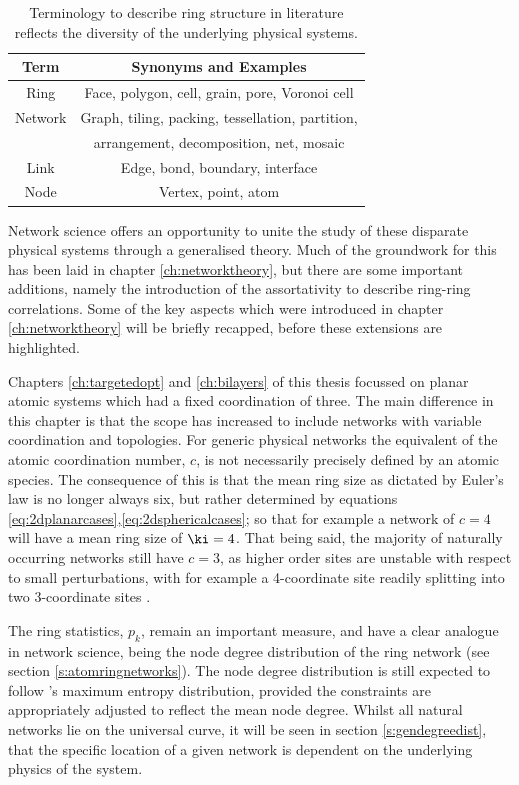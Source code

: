 \begin{table}[bt]
	\centering
     \caption{Terminology to describe ring structure in literature reflects the diversity of the underlying physical systems.}
     \label{tab:genterms}
     \begin{tabular}{cc}
     \toprule
     Term & Synonyms and Examples \\
     \midrule
     Ring & Face, polygon, cell, grain, pore, Voronoi cell\\
     Network & Graph, tiling, packing, tessellation, partition, \\
     & arrangement, decomposition, net, mosaic\\
     Link & Edge, bond, boundary, interface \\
     Node & Vertex, point, atom \\
     \bottomrule
     \end{tabular}
\end{table}
Network science offers an opportunity to unite the study of these disparate physical systems through a generalised theory.
Much of the groundwork for this has been laid in chapter \ref{ch:networktheory}, but there are some important additions, namely the introduction of the assortativity to describe ring\--ring correlations.
Some of the key aspects which were introduced in chapter \ref{ch:networktheory} will be briefly recapped, before these extensions are highlighted.

Chapters \ref{ch:targetedopt} and \ref{ch:bilayers} of this thesis focussed on planar atomic systems which had a fixed coordination of three.
The main difference in this chapter is that the scope has increased to include networks with variable coordination and topologies.
For generic physical networks the equivalent of the atomic coordination number, $c$, is not necessarily precisely defined by an atomic species. 
The consequence of this is that the mean ring size as dictated by Euler's law is no longer always six, but rather determined by equations \eqref{eq:2dplanarcases},\eqref{eq:2dsphericalcases}; so that for example a network of $c=4$ will have a mean ring size of $\ki=4$.
That being said, the majority of naturally occurring networks still have $c=3$, as higher order sites are unstable with respect to small perturbations, with for example a 4\--coordinate site readily splitting into two 3\--coordinate sites \cite{Caer1993}.

The ring statistics, $p_k$, remain an important measure, and have a clear analogue in network science, being the node degree distribution of the ring network (see section \ref{s:atomringnetworks}).
The node degree distribution is still expected to follow \lm's maximum entropy distribution, provided the constraints are appropriately adjusted to reflect the mean node degree.
Whilst all natural networks lie on the universal \lm{} curve, it will be seen in section \ref{s:gendegreedist}, that the specific location of a given network is dependent on the underlying physics of the system.

